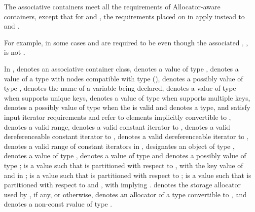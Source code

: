 \pnum
The associative containers meet all the requirements of Allocator-aware
containers, except that for
 and , the requirements placed on 
in  apply instead to 
and . \begin{note} For example, in some cases  and 
are required to be  even though the associated
, , is not
. \end{note}

\pnum
In ,
 denotes an associative container class,
 denotes a value of type ,
 denotes a value of a type with nodes compatible with type
 (),
 denotes a possibly  value of type ,
 denotes the name of a variable being declared,
 denotes a value of type 
when  supports unique keys,
 denotes a value of type 
when  supports multiple keys,
 denotes a possibly  value of type 
when the 
 is valid
and denotes a type,
 and 
satisfy input iterator requirements and refer to elements
implicitly convertible to
, 
denotes a valid range,
 denotes a valid constant iterator to ,
 denotes a valid dereferenceable constant iterator to ,
 denotes a valid dereferenceable iterator to ,
\tcode{[q1, q2)} denotes a valid range of constant iterators in ,
 designates an object of type ,
 denotes a value of type ,
 denotes a value of type 
and  denotes a possibly  value of type ;
 is a value such that  is partitioned
with respect to , with  the key value of 
and  in ;
 is a value such that  is partitioned with respect to
;
 is a value such that  is partitioned with respect to
 and , with  implying
.
 denotes the storage allocator used by , if any, or  otherwise,
 denotes an allocator of a type convertible to ,
and  denotes a non-const rvalue of type .

